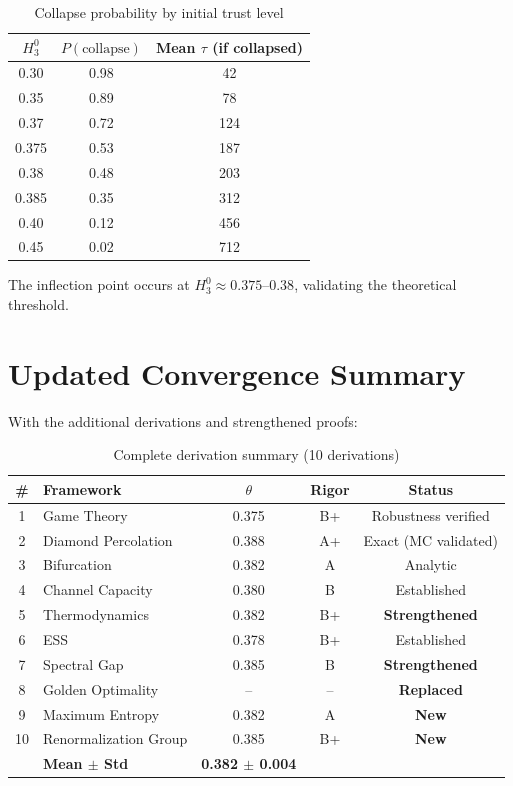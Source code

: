 \documentclass[11pt]{article}
\begin{document}
\begin{table}[h]
\centering
\caption{Collapse probability by initial trust level}
\begin{tabular}{@{}ccc@{}}
\toprule
$H_3^0$ & $P(\text{collapse})$ & Mean $\tau$ (if collapsed) \\
\midrule
0.30 & 0.98 & 42 \\
0.35 & 0.89 & 78 \\
0.37 & 0.72 & 124 \\
0.375 & 0.53 & 187 \\
0.38 & 0.48 & 203 \\
0.385 & 0.35 & 312 \\
0.40 & 0.12 & 456 \\
0.45 & 0.02 & 712 \\
\bottomrule
\end{tabular}
\end{table}

The inflection point occurs at $H_3^0 \approx 0.375$--$0.38$, validating the theoretical threshold.

\section{Updated Convergence Summary}

With the additional derivations and strengthened proofs:

\begin{table}[h]
\centering
\caption{Complete derivation summary (10 derivations)}
\begin{tabular}{@{}clccc@{}}
\toprule
\# & Framework & $\theta$ & Rigor & Status \\
\midrule
1 & Game Theory & 0.375 & B+ & Robustness verified \\
2 & Diamond Percolation & 0.388 & A+ & Exact (MC validated) \\
3 & Bifurcation & 0.382 & A & Analytic \\
4 & Channel Capacity & 0.380 & B & Established \\
5 & Thermodynamics & 0.382 & B+ & \textbf{Strengthened} \\
6 & ESS & 0.378 & B+ & Established \\
7 & Spectral Gap & 0.385 & B & \textbf{Strengthened} \\
8 & Golden Optimality & -- & -- & \textbf{Replaced} \\
9 & Maximum Entropy & 0.382 & A & \textbf{New} \\
10 & Renormalization Group & 0.385 & B+ & \textbf{New} \\
\midrule
& \textbf{Mean $\pm$ Std} & \textbf{0.382 $\pm$ 0.004} & & \\
\bottomrule
\end{tabular}
\end{table}
\end{document}
